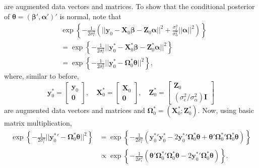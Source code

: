 \documentclass[cmfont,usenames,dvipsnames,leqno]{afit-etd}\usepackage[]{graphicx}\usepackage[]{color}
\begin{document}
are augmented data vectors and matrices. To show that the conditional posterior of $\boldsymbol{\theta} = \left(\boldsymbol{\beta}', \boldsymbol{\alpha}'\right)'$ is normal, note that
\begin{align*}
  &\exp\left\{-\frac{1}{2\sigma_\epsilon^2}\left(||\boldsymbol{y}_0 - \boldsymbol{X}_0\boldsymbol{\beta} - \boldsymbol{Z}_0\boldsymbol{\alpha}||^2 + \frac{\sigma_\epsilon^2}{\sigma_\alpha^2}||\boldsymbol{\alpha}||^2\right)\right\} \\
  &= \exp\left\{-\frac{1}{2\sigma_\epsilon^2}||\boldsymbol{y}_0^* - \boldsymbol{X}_0^*\boldsymbol{\beta} - \boldsymbol{Z}_0^*\boldsymbol{\alpha}||^2\right\} \\
  &= \exp\left\{-\frac{1}{2\sigma_\epsilon^2}||\boldsymbol{y}_0^* - \boldsymbol{\Omega}_0^*\boldsymbol{\theta}||^2\right\},
\end{align*}
where, similar to before,
\begin{equation*}
  \boldsymbol{y}_0^* = \begin{bmatrix} \boldsymbol{y}_0 \\ \boldsymbol{0} \end{bmatrix}, \quad
  \boldsymbol{X}_0^* = \begin{bmatrix} \boldsymbol{X}_0 \\ \boldsymbol{0} \end{bmatrix}, \quad
  \boldsymbol{Z}_0^* = \begin{bmatrix} \boldsymbol{Z}_0 \\ \left(\sigma_\epsilon^2/\sigma_\alpha^2\right)\boldsymbol{I} \end{bmatrix}
\end{equation*}
are augmented data vectors and matrices and $\boldsymbol{\Omega}_0^* = \left(\boldsymbol{X}_0^*; \boldsymbol{Z}_0^*\right)$. Now, using basic matrix multiplication,
\begin{align*}
  \exp\left\{-\frac{1}{2\sigma_\epsilon^2}||{\boldsymbol{y}_0^*}' - \boldsymbol{\Omega}_0^*\boldsymbol{\theta}||^2\right\}
  &= \exp\left\{-\frac{1}{2\sigma_\epsilon^2}\left({\boldsymbol{y}_0^*}'\boldsymbol{y}_0^* - 2{\boldsymbol{y}_0^*}'\boldsymbol{\Omega}_0^*\boldsymbol{\theta} + \boldsymbol{\theta}'{\boldsymbol{\Omega}_0^*}'\boldsymbol{\Omega}_0^*\boldsymbol{\theta}\right)\right\} \\
  &\propto \exp\left\{-\frac{1}{2\sigma_\epsilon^2}\left(\boldsymbol{\theta}'{\boldsymbol{\Omega}_0^*}'\boldsymbol{\Omega}_0^*\boldsymbol{\theta} - 2{\boldsymbol{y}_0^*}'\boldsymbol{\Omega}_0^*\boldsymbol{\theta}\right)\right\}.
\end{align*}
\end{document}
